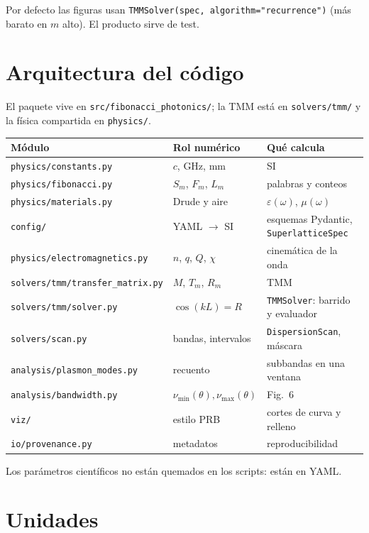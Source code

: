 \documentclass[11pt,a4paper]{article}
\begin{document}
Por defecto las figuras usan \texttt{TMMSolver(spec, algorithm="recurrence")} (más barato en \(m\)
alto). El producto sirve de test.

\section{Arquitectura del código}

El paquete vive en \texttt{src/fibonacci\_photonics/}; la TMM está en
\texttt{solvers/tmm/} y la física compartida en \texttt{physics/}.

{\small
\begin{center}
\begin{tabular}{llp{6.8cm}}
\toprule
Módulo & Rol numérico & Qué calcula \\
\midrule
\texttt{physics/constants.py} & \(c\), GHz, mm & SI \\
\texttt{physics/fibonacci.py} & \(S_m\), \(F_m\), \(L_m\) & palabras y conteos \\
\texttt{physics/materials.py} & Drude y aire & \(\varepsilon(\omega)\), \(\mu(\omega)\) \\
\texttt{config/} & YAML \(\to\) SI & esquemas Pydantic, \texttt{SuperlatticeSpec} \\
\texttt{physics/electromagnetics.py} & \(n\), \(q\), \(Q\), \(\chi\) & cinemática de la onda \\
\texttt{solvers/tmm/transfer\_matrix.py} & \(M\), \(T_m\), \(R_m\) & TMM \\
\texttt{solvers/tmm/solver.py} & \(\cos(kL)=R\) & \texttt{TMMSolver}: barrido y evaluador \\
\texttt{solvers/scan.py} & bandas, intervalos & \texttt{DispersionScan}, máscara \\
\texttt{analysis/plasmon\_modes.py} & recuento & subbandas en una ventana \\
\texttt{analysis/bandwidth.py} & \(\nu_{\min}(\theta),\nu_{\max}(\theta)\) & Fig.~6 \\
\texttt{viz/} & estilo PRB & cortes de curva y relleno \\
\texttt{io/provenance.py} & metadatos & reproducibilidad \\
\bottomrule
\end{tabular}
\end{center}
}

Los parámetros científicos no están quemados en los scripts: están en YAML.

\section{Unidades}
\end{document}
